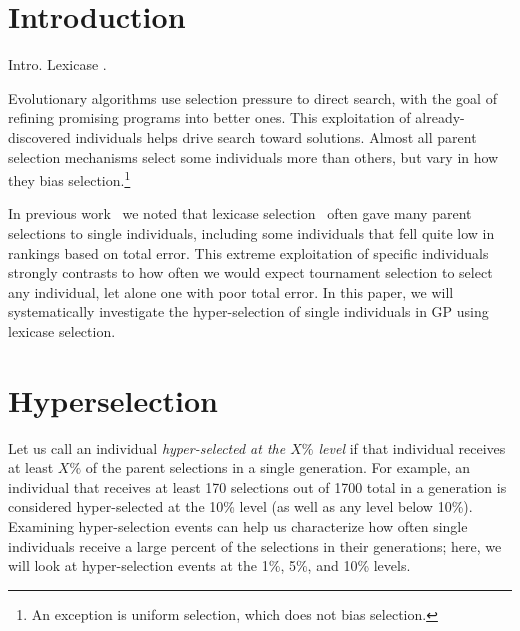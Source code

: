 \documentclass{sig-alternate}
\newcommand{\definition}[1]{\textit{#1}}
\begin{document}


%
%

%
%
\printccsdesc



\section{Introduction}
\label{section:introduction}

Intro. Lexicase \cite{Helmuth:2014:ieeeTEC}.


Evolutionary algorithms use selection pressure to direct search, with the goal of refining promising programs into better ones. This exploitation of already-discovered individuals helps drive search toward solutions. Almost all parent selection mechanisms select some individuals more than others, but vary in how they bias selection.\footnote{An exception is uniform selection, which does not bias selection.}

In previous work~\cite{Helmuth:2015:GPTP,Helmuth:2015:dissertation} we noted that lexicase selection~\cite{Helmuth:2014:ieeeTEC} often gave many parent selections to single individuals, including some individuals that fell quite low in rankings based on total error. This extreme exploitation of specific individuals strongly contrasts to how often we would expect tournament selection to select any individual, let alone one with poor total error. In this paper, we will systematically investigate the hyper-selection of single individuals in GP using lexicase selection.


\section{Hyperselection}
\label{section:hyperselection}

Let us call an individual \definition{hyper-selected at the $X\%$ level} if that individual receives at least $X\%$ of the parent selections in a single generation. For example, an individual that receives at least 170 selections out of 1700 total in a generation is considered hyper-selected at the 10\% level (as well as any level below 10\%). Examining hyper-selection events can help us characterize how often single individuals receive a large percent of the selections in their generations; here, we will %
look at hyper-selection events at the 1\%, 5\%, and 10\% levels.
\end{document}
